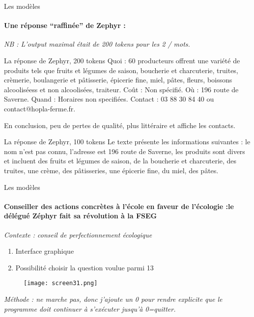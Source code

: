 \documentclass{beamer}
\begin{document}
\begin{frame}{Les modèles}
\framesubtitle{Une réponse “raffinée” de Zephyr :}

\textit{NB : L’output maximal était de 200 tokens pour les 2 / mots.}

\begin{block}{La réponse de Zephyr, 200 tokens}
\footnotesize Quoi : 60 producteurs offrent une variété de produits tels que fruits et légumes de saison, boucherie et charcuterie, truites, crèmerie, boulangerie et pâtisserie, épicerie fine, miel, pâtes, fleurs, boissons alcooliséess et non alcoolisées, traiteur.
Coût : Non spécifié.
Où : 196 route de Saverne.
Quand : Horaires non specifiées.
Contact : 03 88 30 84 40 ou contact@hopla-ferme.fr.
\end{block}

En conclusion, peu de pertes de qualité, plus littéraire et affiche les contacts.

\begin{block}{La réponse de Zephyr, 100 tokens}
\footnotesize Le texte présente les informations suivantes : le nom n'est pas connu, l'adresse est 196 route de Saverne, les produits sont divers et incluent des fruits et légumes de saison, de la boucherie et charcuterie, des truites, une crème, des pâtisseries, une épicerie fine, du miel, des pâtes.
\end{block}
    
\end{frame}


\begin{frame}{Les modèles}
\framesubtitle{Conseiller des actions concrètes à l’école en faveur de l’écologie :le délégué Zéphyr fait sa révolution à la FSEG}

\textit{Contexte : conseil de perfectionnement écologique}

\begin{enumerate}
    \item Interface graphique 
    \item Possibilité choisir la question voulue parmi 13
\end{enumerate}

\begin{figure}
    \centering
    \texttt{[image: screen31.png]}
    \label{fig:enter-label}
\end{figure}

\textit{Méthode : ne marche pas, donc j’ajoute un 0 pour rendre explicite que le programme doit continuer à s’exécuter jusqu’à 0=quitter. }

\end{frame}
\end{document}
